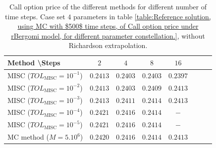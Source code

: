 \begin{table}[h!]
	\centering
	\begin{tabular}{l*{6}{c}r}
		Method \textbackslash  Steps            & $2$ & $4$ & $8$ & $16$ &   \\
		\hline
		MISC ($TOL_{\text{MISC}}=10^{-1}$)  & $0.2413$ &$0.2403$& $0.2403$ & $0.2397$   \\
		MISC ($TOL_{\text{MISC}}=10^{-2}$)  &$0.2413$ & $0.2403$ & $0.2409$ & $0.2413$  \\
		
		MISC ($TOL_{\text{MISC}}=10^{-3}$)  & $0.2413$ & $0.2411$ & $0.2414$ & $0.2413$  \\
		MISC ($TOL_{\text{MISC}}=10^{-4}$)  &  $0.2421$ & $0.2416$ & $0.2414$ & $-$  \\
		
		MISC ($TOL_{\text{MISC}}=10^{-5}$)  & $0.2421$ &$0.2416$ &  $0.2414$ & $-$  \\
		\hline
		MC method ($M=5.10^{6}$)   & $0.2420$ & $0.2416$  & $0.2414$ & $0.2413$ \\		
		
		\hline
	\end{tabular}
	\caption{ Call option price of the different methods for different number of time steps. Case set $4$ parameters in table \ref{table:Reference solution, using MC with $500$ time steps, of Call option price under rBergomi model, for different parameter constellation.}, without Richardson extrapolation.}
	\label{table: Call option price of the different methods for different number of time steps. Case set 4}
\end{table}



